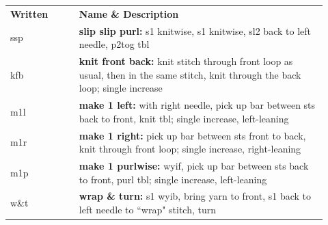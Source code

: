 \documentclass[12pt]{article}
\begin{document}
\begin{titlingpage}
\begin{multicols}{2}
\begin{center}
\begin{tabular}{| C{0.2\linewidth} p{0.72\linewidth} |}
\thickhline {} 
\textbf{Written}	& \textbf{Name \& Description} \\ \thickhline
ssp	& \textbf{slip slip purl:} s1 knitwise, s1 knitwise, sl2 back to left needle, p2tog tbl \\
kfb	& \textbf{knit front back:} knit stitch through front loop as usual, then in the same stitch, knit through the back loop; single increase \\
m1l 		& \textbf{make 1 left:} with right needle, pick up bar between sts back to front, knit tbl; single increase, left-leaning \\
m1r 		& \textbf{make 1 right:} pick up bar between sts front to back, knit through front loop; single increase, right-leaning \\
m1p 		& \textbf{make 1 purlwise:} wyif, pick up bar between sts back to front, purl tbl; single increase, left-leaning \\
w\&t 		& \textbf{wrap \& turn:} s1 wyib, bring yarn to front, s1 back to left needle to ``wrap" stitch, turn \\ \hline
\end{tabular}
\end{center}
\end{multicols}
\normalsize

\end{titlingpage}
\end{document}
